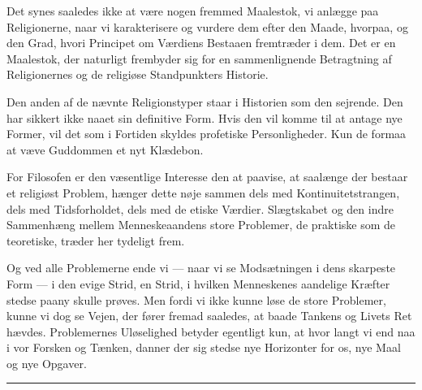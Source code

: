 \documentclass[12pt,a4paper,openany]{book}
\newcommand{\opage}[1]{\marginnote{\footnotesize\textit{[#1]}}}
\begin{document}
Det synes saaledes ikke at være nogen fremmed Maalestok, vi anlægge paa
Religionerne, naar vi karakterisere og vurdere dem efter den Maade, hvorpaa, og
den Grad, hvori Principet om Værdiens Bestaaen fremtræder i dem. Det er en
Maalestok, der naturligt frembyder sig for en sammenlignende Betragtning af
Religionernes og de religiøse Standpunkters Historie.

Den anden af de nævnte Religionstyper staar i Historien
\opage{84}som den sejrende. Den har sikkert ikke naaet sin definitive Form.
Hvis den vil komme til at antage nye Former, vil det som i Fortiden skyldes
profetiske Personligheder. Kun de formaa at væve Guddommen et nyt Klædebon.

For Filosofen er den væsentlige Interesse den at paavise, at saalænge der
bestaar et religiøst Problem, hænger dette nøje sammen dels med
Kontinuitetstrangen, dels med Tidsforholdet, dels med de etiske Værdier.
Slægtskabet og den indre Sammenhæng mellem Menneskeaandens store Problemer, de
praktiske som de teoretiske, træder her tydeligt frem.

Og ved alle Problemerne ende vi --- naar vi se Modsætningen i dens skarpeste
Form --- i den evige Strid, en Strid, i hvilken Menneskenes aandelige Kræfter
stedse paany skulle prøves. Men fordi vi ikke kunne løse de store Problemer,
kunne vi dog se Vejen, der fører fremad saaledes, at baade Tankens og Livets
Ret hævdes. Problemernes Uløselighed betyder egentligt kun, at hvor langt vi
end naa i vor Forsken og Tænken, danner der sig stedse nye Horizonter for os,
nye Maal og nye Opgaver. 

\begin{center}\rule{2cm}{0.4pt}\end{center}
\clearpage
\end{document}
